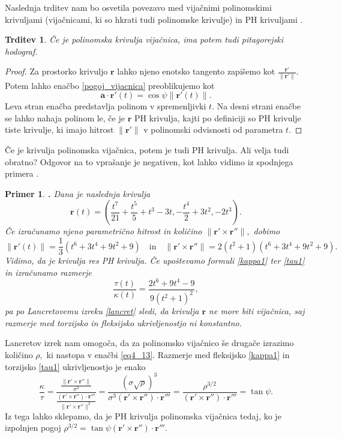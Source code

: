 \documentclass[12pt,a4paper,twoside]{article}
\theoremstyle{definition} %
\theoremstyle{plain} %
\newtheorem{trditev}[definicija]{Trditev}
\theoremstyle{primerstyle}
\newtheorem{primer}[definicija]{Primer}
\numberwithin{equation}{section}  %
\newcommand{\fleksija}{\frac{\lVert \mathbf{r}'\times\mathbf{r}'' \rVert}{\sigma^3}}
\newcommand{\torzija}{\frac{(\mathbf{r}'\times\mathbf{r}'')\cdot\mathbf{r}'''}{\lVert \mathbf{r}'\times\mathbf{r}'' \rVert^2}}
\newcommand{\aV}{\mathbf{a}}
\newcommand{\rV}{\mathbf{r}}
\begin{document}
Naslednja trditev nam bo osvetila povezavo med vijačnimi polinomskimi krivuljami (vijačnicami, ki so hkrati tudi polinomske krivulje) in PH krivuljami \cite{faroukietal2004}.
\begin{trditev}
	\label{trditev_vijacnica_PH}
	Če je polinomska krivulja vijačnica, ima potem tudi pitagorejski hodograf.
\end{trditev}
\begin{proof}
	Za prostorko krivuljo $\rV$ lahko njeno enotsko tangento zapišemo kot $\frac{\rV'}{\lVert \rV' \rVert}.$ Potem lahko enačbo \eqref{pogoj_vijacnica} preoblikujemo kot
	\begin{equation}
		\aV \cdot \rV'(t)=\cos \psi \lVert \rV'(t) \rVert.
	\end{equation}
	Leva stran enačba predstavlja polinom v spremenljivki $t.$ Na desni strani enačbe se lahko nahaja polinom le, če je $\rV$ PH krivulja, kajti po definiciji so PH krivulje tiste krivulje, ki imajo hitrost $\lVert \rV' \rVert$ v polinomski odvisnosti od parametra $t.$
\end{proof}
Če je krivulja polinomska vijačnica, potem je tudi PH krivulja. Ali velja tudi obratno? Odgovor na to vprašanje je negativen, kot lahko vidimo iz spodnjega primera \cite{beltranmonterde}.
\begin{primer}
	\label{PH_ne_vijacnica}
	\textbf{.} Dana je naslednja krivulja
	\begin{equation*}
		\rV(t)=\left ( \frac{t^7}{21}+\frac{t^5}{5}+t^3-3t,-\frac{t^4}{2}+3t^2,-2t^3 \right ).
	\end{equation*}
	Če izračunamo njeno parametrično hitrost in količino $\lVert \rV' \times \rV'' \rVert,$ dobimo
	\begin{equation*}
		\lVert \rV'(t) \rVert=\frac{1}{3}(t^6+3t^4+9t^2+9) \quad \text{in} \quad \lVert \rV' \times \rV'' \rVert=2(t^2+1)(t^6+3t^4+9t^2+9).
	\end{equation*}
	Vidimo, da je krivulja res PH krivulja. Če upoštevamo formuli \eqref{kappa1} ter \eqref{tau1} in izračunamo razmerje
	\begin{equation*}
		\frac{\tau(t)}{\kappa(t)}=\frac{2t^6+9t^4-9}{9(t^2+1)^2},
	\end{equation*}
	pa po Lancretovemu izreku \ref{lancret} sledi, da krivulja $\rV$ ne more biti vijačnica, saj razmerje med torzijsko in fleksijsko ukrivljenostjo ni konstantno.
\end{primer}

Lancretov izrek nam omogoča, da za polinomsko vijačnico še drugače izrazimo količino $\rho,$ ki nastopa v enačbi \eqref{eq4_13}. Razmerje med fleksijsko \eqref{kappa1} in torzijsko \eqref{tau1} ukrivljenostjo je enako
\begin{equation}
	\label{rho3over2}
	\frac{\kappa}{\tau}=\frac{\fleksija}{\torzija}=\frac{(\sigma \sqrt{\rho})^3}{\sigma^3(\rV'\times\rV'')\cdot\rV'''}=\frac{\rho^{3/2}}{(\rV'\times\rV'')\cdot\rV'''}=\tan \psi.
\end{equation}
Iz tega lahko sklepamo, da je PH krivulja polinomska vijačnica tedaj, ko je izpolnjen pogoj $\rho^{3/2}=\tan \psi (\rV'\times\rV'')\cdot\rV'''.$
\end{document}
